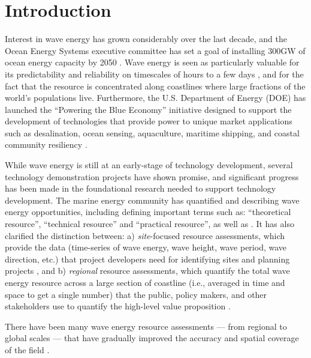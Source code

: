 \section{Introduction}

Interest in wave energy has grown considerably over the last decade, and the Ocean Energy Systems executive committee has set a goal of installing 300GW of ocean energy capacity by 2050 \citep[]{babaritOceanWaveEnergy2017,huckerbyInternationalVisionOcean2017}. Wave energy is seen as particularly
valuable for its predictability and reliability on timescales of hours
to a few days \citep{parkinsonIntegratingOceanWave2015}, and for the
fact that the resource is concentrated along coastlines where large
fractions of the world's populations live. Furthermore, the
U.S. Department of Energy (DOE) has launched the ``Powering the Blue
Economy'' initiative designed to support the development of
technologies that provide power to unique market applications such as
desalination, ocean sensing, aquaculture, maritime shipping, and coastal community
resiliency \citep{livecchiPoweringBlueEconomy2019}. 

While wave energy is still at an early-stage of technology development, several technology demonstration projects have shown promise, and significant progress has been made in the foundational research needed to support technology development. The marine energy community has quantified and describing wave energy opportunities, including defining important terms such as:  ``theoretical resource'', ``technical resource'' and ``practical resource'', as well as  \citep[]{internationalelectrotechnicalcommissionPartTerminologyEdition2020}. It has also clarified the distinction between: a) {\em site}-focused resource assessments, which provide the data (time-series of wave energy, wave height, wave period, wave direction, etc.) that project developers need for identifying sites and planning projects \citep[e.g., ][]{internationalelectrotechnicalcommissionPart101Wave2015, robertsonCharacterizingShoreWave2014, kumarWaveEnergyResource2015}, and b) {\em regional} resource assessments, which quantify the total wave energy resource across a large section of coastline (i.e., averaged in time and space to get a single number) that the public, policy makers, and other stakeholders use to quantify the high-level value proposition \citep[e.g., ][]{EPRIwaveresource2011, gunnQuantifyingGlobalWave2012, hemerRevisedAssessmentAustralia2017}.

There have been many wave energy resource assessments — from regional to global scales — that have gradually improved the accuracy and spatial coverage of the field \citep[]{EPRIwaveresource2011, bedardOceanWaveEnergy2005, allahdadiDevelopmentValidationRegionalscale2019, garciamedinaWaveResourceCharacterization2021, yangCharacteristicsVariabilityNearshore2020, liWaveEnergyResources2021, gunnQuantifyingGlobalWave2012}. 

